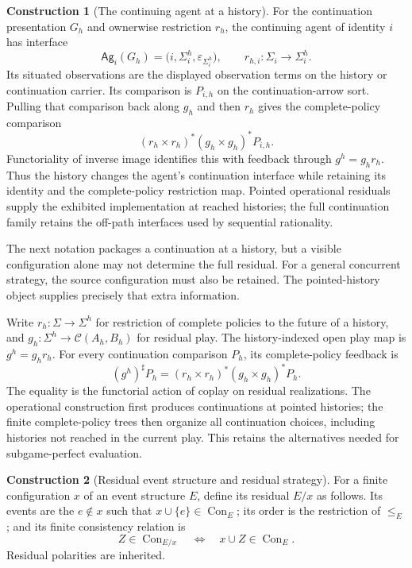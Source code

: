 \documentclass[11pt,a4paper]{article}
\numberwithin{equation}{section}
\theoremstyle{definition}
\newtheorem{construction}[construction]{Construction}
\theoremstyle{remark}
\theoremstyle{plain}
\begin{document}
\begin{construction}[The continuing agent at a history]
\label{con:egt-continuing-agent}
For the continuation presentation $G_h$ and ownerwise restriction $r_h$,
the continuing agent of identity $i$ has interface
\[
 \mathsf{Ag}_i(G_h)
 =\bigl(i,\Sigma_i^h,\varepsilon_{\Sigma_i^h}\bigr),
 \qquad r_{h,i}:\Sigma_i\to\Sigma_i^h.
\]
Its situated observations are the displayed observation terms on the
history or continuation carrier. Its comparison is $P_{i,h}$ on the
continuation-arrow sort. Pulling that comparison back along $g_h$ and then
$r_h$ gives the complete-policy comparison
\[
 (r_h\times r_h)^*(g_h\times g_h)^*P_{i,h}.
\]
Functoriality of inverse image identifies this with feedback through
$g^h=g_hr_h$. Thus the history changes the agent's continuation interface
while retaining its identity and the complete-policy restriction map.
Pointed operational residuals supply the exhibited implementation at reached
histories; the full continuation family retains the off-path interfaces used
by sequential rationality.
\end{construction}

The next notation packages a continuation at a history, but a
visible configuration alone may not determine the full residual.
For a general concurrent strategy, the source configuration must also
be retained. The pointed-history object supplies precisely that extra
information.

Write $r_h:\Sigma\to\Sigma^h$ for restriction of complete policies to
the future of a history, and $g_h:\Sigma^h\to\mathcal C(A_h,B_h)$
for residual play. The history-indexed open play map is $g^h=g_hr_h$.
For every continuation comparison $P_h$, its complete-policy feedback is
\[
 (g^h)^\sharp P_h=(r_h\times r_h)^*(g_h\times g_h)^*P_h.
\]
The equality is the functorial action of coplay on residual
realizations. The operational construction first produces
continuations at pointed histories; the finite complete-policy trees
then organize all continuation choices, including histories not
reached in the current play. This retains the alternatives needed
for subgame-perfect evaluation.

\begin{construction}[Residual event structure and residual strategy]
For a finite configuration $x$ of an event structure $E$, define its
residual $E/x$ as follows. Its events are the $e\notin x$ such that
$x\cup\{e\}\in\operatorname{Con}_E$; its order is the restriction of $\leq_E$;
and its finite consistency relation is
\[
 Z\in\operatorname{Con}_{E/x}\quad\Longleftrightarrow\quad
 x\cup Z\in\operatorname{Con}_E.
\]
Residual polarities are inherited.
\end{construction}
\end{document}
